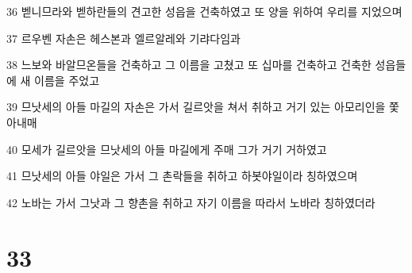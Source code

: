 \par 36 벧니므라와 벧하란들의 견고한 성읍을 건축하였고 또 양을 위하여 우리를 지었으며
\par 37 르우벤 자손은 헤스본과 엘르알레와 기랴다임과
\par 38 느보와 바알므온들을 건축하고 그 이름을 고쳤고 또 십마를 건축하고 건축한 성읍들에 새 이름을 주었고
\par 39 므낫세의 아들 마길의 자손은 가서 길르앗을 쳐서 취하고 거기 있는 아모리인을 쫓아내매
\par 40 모세가 길르앗을 므낫세의 아들 마길에게 주매 그가 거기 거하였고
\par 41 므낫세의 아들 야일은 가서 그 촌락들을 취하고 하봇야일이라 칭하였으며
\par 42 노바는 가서 그낫과 그 향촌을 취하고 자기 이름을 따라서 노바라 칭하였더라

\chapter{33}

